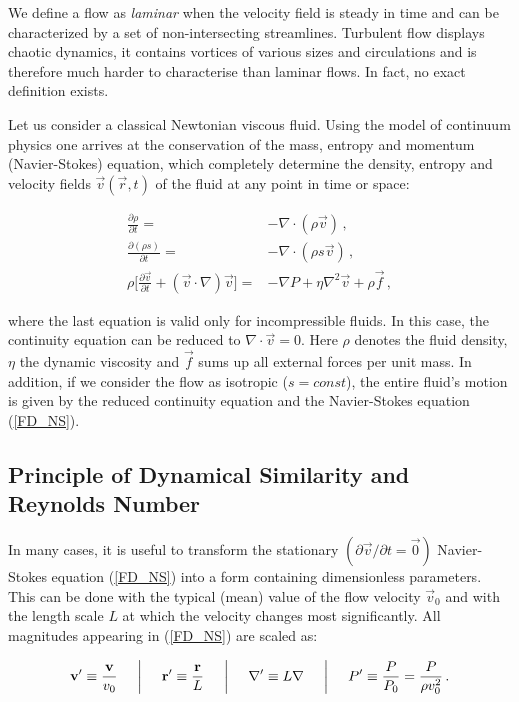 We define a flow as \textit{laminar} when the velocity field is steady in time and can be characterized by a set of non-intersecting streamlines. Turbulent flow displays chaotic dynamics, it contains vortices of various sizes and circulations and is therefore much harder to characterise than laminar flows. In fact, no exact definition exists.

Let us consider a classical Newtonian viscous fluid. Using the model of continuum physics one arrives\cite{landau} at the conservation of the mass, entropy and momentum (Navier-Stokes) equation, which completely determine the density, entropy and velocity fields $\vec{v}(\vec{r},t)$ of the fluid at any point in time or space:

\begin{align}
\frac{\partial \rho}{\partial t}
=& - \nabla \cdot (\rho\vec{v})\,,
\label{FD_mass}\\
\frac{\partial (\rho s)}{\partial t}
=& - \nabla \cdot (\rho s \vec{v})\,,
\label{FD_entropy}\\
\rho \bigg[ \frac{\partial\vec{v}}{\partial t}
+ (\vec{v}\cdot \nabla)\vec{v} \bigg ]
=& -\nabla P
+ \eta \nabla^2 \vec{v}
+ \rho\vec{f}\,,
\label{FD_NS}
\end{align}

where the last equation is valid only for incompressible fluids. In this case, the continuity equation can be reduced to $ \nabla \cdot \vec{v} = 0 $. Here $\rho$ denotes the fluid density, $\eta$ the dynamic viscosity and $\vec{f}$ sums up all external forces per unit mass. In addition, if we consider the flow as isotropic ($s = \unit{const}$), the entire fluid's motion is given by the reduced continuity equation and the Navier-Stokes equation (\ref{FD_NS}).

\subsection*{Principle of Dynamical Similarity and Reynolds Number}

In many cases, it is useful to transform the stationary $ (\partial \vec{v}/\partial t = \vec{0}) $ Navier-Stokes equation (\ref{FD_NS}) into a form containing dimensionless parameters. This can be done with the typical (mean) value of the flow velocity $\vec{v}_0$ and with the length scale $L$ at which the velocity changes most significantly. All magnitudes appearing in (\ref{FD_NS}) are scaled as:

$$
\vec{v^{\prime}} \equiv \frac{\vec{v}}{v_0}
\hspace{5mm} \bigg\vert \hspace{5mm}
\vec{r}^{\prime} \equiv \frac{\vec{r}}{L}
\hspace{5mm} \bigg\vert \hspace{5mm}
\nabla^{\prime}  \equiv L\nabla
\hspace{5mm} \bigg\vert \hspace{5mm}
P^{\prime}       \equiv \frac{P}{P_0} = \frac{P}{\rho v_0^2}\,.
$$

